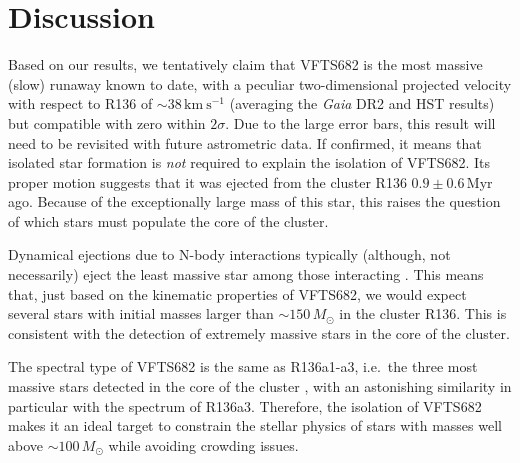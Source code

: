 \documentclass[apjl,twocolumn]{emulateapj}
\newcommand{\kms}{{\,\mathrm{km\ s^{-1}}}}
\begin{document}
\section{Discussion}
\label{sec:discussion}

Based on our results, we tentatively claim that VFTS682 is the most massive
(slow) runaway known to date, with a peculiar two-dimensional
projected velocity with respect to R136 of
$\sim38\kms$ (averaging the \emph{Gaia} DR2 and HST
results) but compatible with zero within $2\sigma$. Due to the large error bars, this result will need
to be revisited with future astrometric data. %
If confirmed, it means that isolated star formation is
\emph{not} required to explain the isolation of VFTS682. Its proper motion suggests that it was ejected from the cluster R136
$0.9\pm0.6$\,Myr ago. Because of the exceptionally large mass
of this star, this raises the question of which stars must populate
the core of the cluster.

Dynamical ejections due to N-body interactions typically (although, not necessarily) eject the least
massive star among those interacting \cite[e.g.,][]{banerjee:12}. This means that, just
based on the kinematic properties of VFTS682, we would expect several
stars with initial masses larger than $\sim$$150\,M_\odot$ in the
cluster R136.
This is consistent with the detection
of extremely massive stars in the core of the
cluster. %

The spectral type of VFTS682
\citep[WNh5,][]{bestenlehner:11} is the same as R136a1-a3, i.e.~the
three most massive stars detected in the core of the cluster%
, with an astonishing similarity in particular with
the spectrum of R136a3. Therefore, the isolation of
VFTS682 makes it an ideal target to constrain the stellar physics of
stars with masses well above $\sim$$100\,M_\odot$ while avoiding
crowding issues. %
\end{document}
